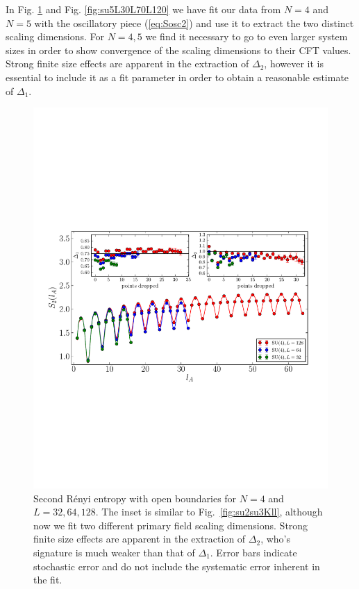 \documentclass[aps,prb,reprint,floatfix]{revtex4-1}
\begin{document}
In Fig. \ref{fig:su4L32L64L128}  and Fig. \ref{fig:su5L30L70L120} we have fit our data from $N=4$ and $N=5$ with the oscillatory piece (\ref{eq:Sosc2}) and use it to extract the two distinct scaling dimensions.  For $N=4,5$ we find it necessary to go to even larger system sizes in order to show convergence of the scaling dimensions to their CFT values.  Strong finite size effects are apparent in the extraction of $\Delta_{2}$, however it is essential to include it as a fit parameter in order to obtain a reasonable estimate of $\Delta_{1}$.

\begin{figure}
\centerline{\includegraphics[angle=0,width=1.0\columnwidth]{su4Kll1Kll2.pdf}}
\caption{Second R\'{e}nyi entropy with open boundaries for $N=4$ and $L=32,64,128$. The inset is similar to Fig.~\ref{fig:su2su3Kll}, although now we fit two different primary field scaling dimensions. Strong finite size effects are apparent in the extraction of $\Delta_{2}$, who's signature is much weaker than that of $\Delta_{1}$.  Error bars indicate stochastic error and do not include the systematic error inherent in the fit.}
\label{fig:su4L32L64L128}
\end{figure}
\end{document}
